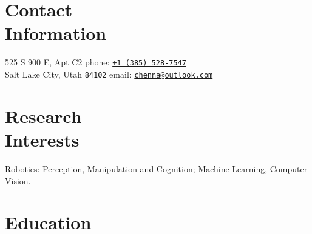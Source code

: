 \documentclass[letterpaper, margin, line]{resume}
\begin{document}
\author{Kautilya Chenna}

\begin{resume}

    \section{\mysidestyle Contact\\Information}

    525 S 900 E, Apt C2                            \hfill phone: \texttt{\href{tel:13855287547}{+1 (385) 528-7547}}          \vspace{0mm}\\\vspace{0mm}%
    Salt Lake City, Utah \texttt{84102}                          \hfill email: \texttt{\href{mailto:chenna@outlook.com}{chenna@outlook.com}}          \vspace{1pt}%

    \section{\mysidestyle Research\\Interests}

    Robotics: Perception, Manipulation and Cognition; Machine Learning, Computer Vision.
    \vspace{1pt}

    \section{\mysidestyle Education}


\end{resume}
\end{document}
